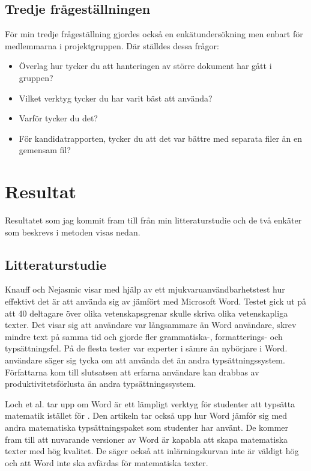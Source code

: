\subsection{Tredje frågeställningen}

För min tredje frågeställning gjordes också en enkätundersökning men enbart för medlemmarna i projektgruppen. Där ställdes dessa frågor:
\begin{itemize}
	\item Överlag hur tycker du att hanteringen av större dokument har gått i gruppen?
	\item Vilket verktyg tycker du har varit bäst att använda?
	\item Varför tycker du det?
	\item För kandidatrapporten, tycker du att det var bättre med separata filer än en gemensam fil?
\end{itemize}

\section{Resultat}
\label{sec:results-tuhkala}
Resultatet som jag kommit fram till från min litteraturstudie och de två enkäter som beskrevs i metoden visas nedan.

\subsection{Litteraturstudie}
Knauff och Nejasmic \cite{knauff2014efficiency} visar med hjälp av ett mjukvaruanvändbarhetstest hur effektivt det är att använda sig av \latex jämfört med Microsoft Word. Testet gick ut på att 40 deltagare över olika vetenskapsgrenar skulle skriva olika vetenskapliga texter.
Det visar sig att \latex användare var långsammare än Word användare, skrev mindre text på samma tid och gjorde fler grammatiska-, formatterings- och typsättningsfel. På de flesta tester var experter i \latex sämre än nybörjare i Word. \latex användare säger sig tycka om att använda det än andra typsättningssystem. Författarna kom till slutsatsen att erfarna \latex användare kan drabbas av produktivitetsförlusta än andra typsättningssystem.

Loch et al. \cite{loch2014master} tar upp om Word är ett lämpligt verktyg för studenter att typsätta matematik istället för \latex. Den artikeln tar också upp hur Word jämför sig med andra matematiska typsättningspaket som studenter har använt. De kommer fram till att nuvarande versioner av Word är kapabla att skapa matematiska texter med hög kvalitet. De säger också att inlärningskurvan inte är väldigt hög och att Word inte ska avfärdas för matematiska texter.  

